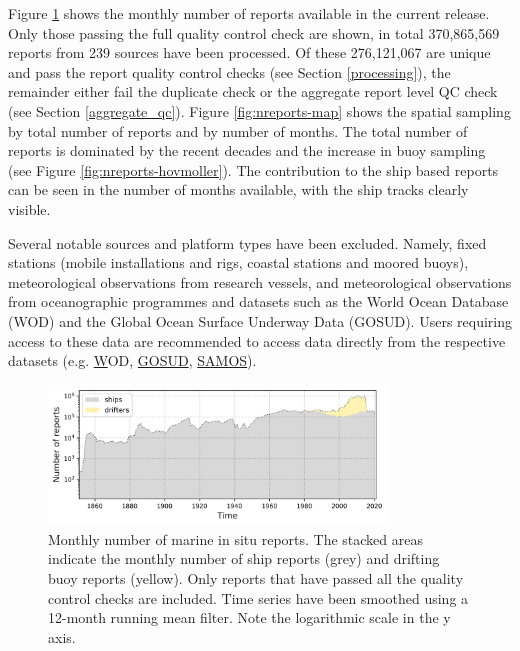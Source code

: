 Figure \ref{fig:nreports-ts} shows the monthly number of reports available in the current release. 
Only those passing the full quality control check are shown, in total 370,865,569 reports from 239 sources have been processed.
Of these 276,121,067 are unique and pass the report quality control checks (see Section \ref{processing}), the remainder either fail the duplicate check or the aggregate report level QC check (see Section \ref{aggregate_qc}).
Figure \ref{fig:nreports-map} shows the spatial sampling by total number of reports and by number of months. 
The total number of reports is dominated by the recent decades and the increase in buoy sampling (see Figure \ref{fig:nreports-hovmoller}). 
The contribution to the ship based reports can be seen in the number of months available, with the ship tracks clearly visible.

Several notable sources and platform types have been excluded.
Namely, fixed stations (mobile installations and rigs, coastal stations and moored buoys), meteorological observations from research vessels, and meteorological observations from oceanographic programmes and datasets such as the World Ocean Database (WOD) and the Global Ocean Surface Underway Data (GOSUD). 
Users requiring access to these data are recommended to access data directly from the respective datasets (e.g. \href{https://www.ncei.noaa.gov/access/world-ocean-database-select/dbsearch.html} WOD, \href{http://www.gosud.org/}{GOSUD}, \href{https://samos.coaps.fsu.edu/html/nav.php?s=2}{SAMOS}).

\begin{figure} [h]
    \centering
    \includegraphics[width=0.8\textwidth]{resources/nreports-ts.png}
    \caption{Monthly number of marine in situ reports. The stacked areas indicate the monthly number of ship reports (grey) and drifting buoy reports (yellow). Only reports that have passed all the quality control checks are included. Time series have been smoothed using a 12-month running mean filter. Note the logarithmic scale in the y axis.}
    \label{fig:nreports-ts}
\end{figure}

